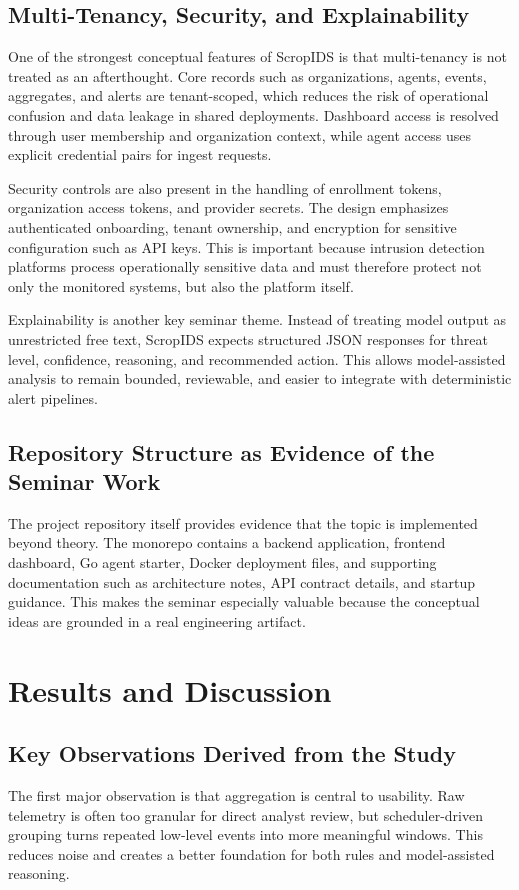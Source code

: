 \documentclass[12pt,a4paper]{report}
\begin{document}
\section{Multi-Tenancy, Security, and Explainability}
One of the strongest conceptual features of ScropIDS is that multi-tenancy is not treated as an afterthought. Core records such as organizations, agents, events, aggregates, and alerts are tenant-scoped, which reduces the risk of operational confusion and data leakage in shared deployments. Dashboard access is resolved through user membership and organization context, while agent access uses explicit credential pairs for ingest requests.

Security controls are also present in the handling of enrollment tokens, organization access tokens, and provider secrets. The design emphasizes authenticated onboarding, tenant ownership, and encryption for sensitive configuration such as API keys. This is important because intrusion detection platforms process operationally sensitive data and must therefore protect not only the monitored systems, but also the platform itself.

Explainability is another key seminar theme. Instead of treating model output as unrestricted free text, ScropIDS expects structured JSON responses for threat level, confidence, reasoning, and recommended action. This allows model-assisted analysis to remain bounded, reviewable, and easier to integrate with deterministic alert pipelines.

\section{Repository Structure as Evidence of the Seminar Work}
The project repository itself provides evidence that the topic is implemented beyond theory. The monorepo contains a backend application, frontend dashboard, Go agent starter, Docker deployment files, and supporting documentation such as architecture notes, API contract details, and startup guidance. This makes the seminar especially valuable because the conceptual ideas are grounded in a real engineering artifact.

\chapter{Results and Discussion}

\section{Key Observations Derived from the Study}
The first major observation is that aggregation is central to usability. Raw telemetry is often too granular for direct analyst review, but scheduler-driven grouping turns repeated low-level events into more meaningful windows. This reduces noise and creates a better foundation for both rules and model-assisted reasoning.
\end{document}
